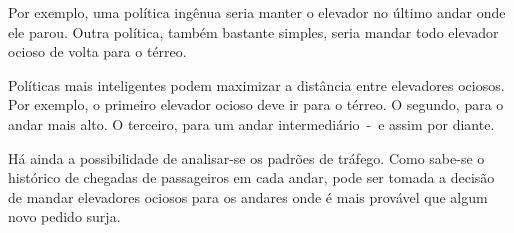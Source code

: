 Por exemplo, uma política ingênua seria manter o elevador no último andar onde
ele parou. Outra política, também bastante simples, seria mandar todo elevador
ocioso de volta para o térreo.

Políticas mais inteligentes podem maximizar a distância entre elevadores
ociosos. Por exemplo, o primeiro elevador ocioso deve ir para o térreo. O
segundo, para o andar mais alto. O terceiro, para um andar intermediário~-~e
assim por diante.

Há ainda a possibilidade de analisar-se os padrões de tráfego. %
Como sabe-se o histórico de chegadas de passageiros em cada andar, pode ser
tomada a decisão de mandar elevadores ociosos para os andares onde é mais
provável que algum novo pedido surja.